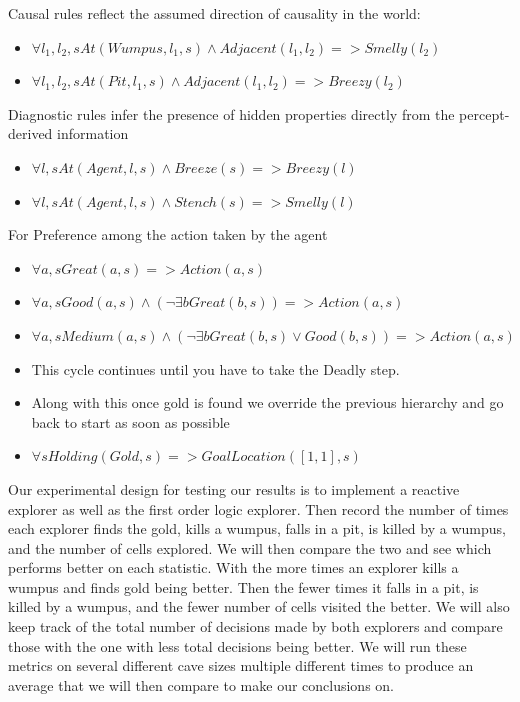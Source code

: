 \documentclass{article}
\begin{document}
Causal rules reflect the assumed direction of causality in the world:
\begin{itemize}
    \item  $\forall l_1,l_2,s At(Wumpus,l_1,s) \wedge Adjacent(l_1,l_2)=>Smelly(l_2)$
    \item $\forall l_1,l_2,s At(Pit,l_1,s) \wedge Adjacent(l_1,l_2)=>Breezy(l_2)$
\end{itemize}

Diagnostic rules infer the presence of hidden properties directly from the percept-derived information
\begin{itemize}
    \item  $\forall l,s At(Agent,l,s) \wedge Breeze(s) => Breezy(l)$
    \item $\forall l,s At(Agent,l,s) \wedge Stench(s) => Smelly(l)$
\end{itemize}

For Preference among the action taken by the agent
\begin{itemize}
    \item $\forall a,s Great(a,s) => Action(a,s)$
    \item $\forall a,s Good(a,s) \wedge (\lnot \exists b Great(b,s)) => Action(a,s)$
    \item $\forall a,s Medium(a,s) \wedge (\lnot \exists b Great(b,s) \lor Good(b,s)) => Action(a,s)$
    \item This cycle continues until you have to take the Deadly step.
    \item Along with this once gold is found we override the previous hierarchy and go back to start as soon as possible
    \item $\forall s Holding(Gold, s) => GoalLocation([1,1], s)$
\end{itemize}




Our experimental design for testing our results is to implement a reactive explorer as well as the first order 
logic explorer. Then record the number of times each explorer finds the gold, kills a wumpus, falls in a pit, 
is killed by a wumpus, and the number of cells explored. We will then compare the two and see which performs 
better on each statistic. With the more times an explorer kills a wumpus and finds gold being better. Then the 
fewer times it falls in a pit, is killed by a wumpus, and the fewer number of cells visited the better. We will 
also keep track of the total number of decisions made by both explorers and compare those with the one with less 
total decisions being better. We will run these metrics on several different cave sizes multiple different times 
to produce an average that we will then compare to make our conclusions on.
\end{document}
